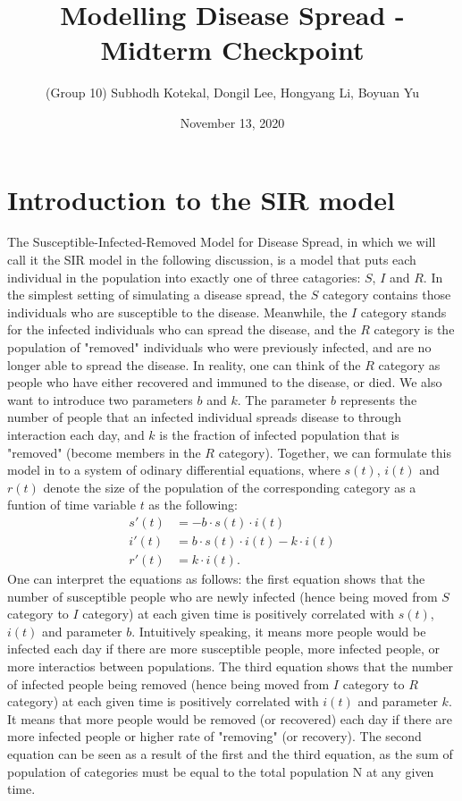 \documentclass[12pt, reqno]{amsart}
\title{Modelling Disease Spread - Midterm Checkpoint}
\author{(Group 10) Subhodh Kotekal, Dongil Lee, Hongyang Li, Boyuan Yu}
\date{November 13, 2020}
\begin{document}
    \maketitle

    \section{Introduction to the SIR model}

    The Susceptible-Infected-Removed Model for Disease Spread, in which we will call it the SIR model in the following discussion, is a model that puts each individual in the population into exactly one of three catagories: \(S\), \(I\) and \(R\). In the simplest setting of simulating a disease spread, the \(S\) category contains those individuals who are susceptible to the disease. Meanwhile, the \(I\) category stands for the infected individuals who can spread the disease, and the \(R\) category is the population of "removed" individuals who were previously infected, and are no longer able to spread the disease. In reality, one can think of the \(R\) category as people who have either recovered and immuned to the disease, or died. We also want to introduce two parameters \(b\) and \(k\). The parameter \(b\) represents the number of people that an infected individual spreads disease to through interaction each day, and \(k\) is the fraction of infected population that is "removed" (become members in the \(R\) category). Together, we can formulate this model in to a system of odinary differential equations, where \(s(t)\), \(i(t)\) and \(r(t)\) denote the size of the population of the corresponding category as a funtion of time variable \(t\) as the following:
    \begin{align*}
        s'(t) &= -b\cdot s(t) \cdot i(t) \\
        i'(t) &= b \cdot s(t) \cdot i(t) - k\cdot i(t) \\
        r'(t) &= k \cdot i(t).
    \end{align*}
One can interpret the equations as follows: the first equation shows that the number of susceptible people who are newly infected (hence being moved from \(S\) category to \(I\) category) at each given time is positively correlated with \(s(t)\), \(i(t)\) and parameter \(b\). Intuitively speaking, it means more people would be infected each day if there are more susceptible people, more infected people, or more interactios between populations. The third equation shows that the number of infected people being removed (hence being moved from \(I\) category to \(R\) category) at each given time is positively correlated with \(i(t)\) and parameter \(k\). It means that more people would be removed (or recovered) each day if there are more infected people or higher rate of "removing" (or recovery). The second equation can be seen as a result of the first and the third equation, as the sum of population of categories must be equal to the total population N at any given time.
\end{document}
